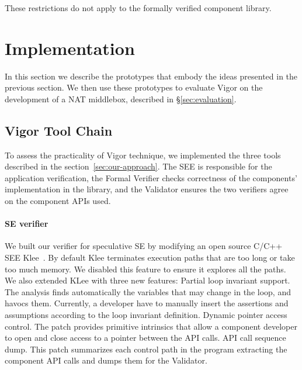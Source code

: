 \documentclass[letterpaper,twocolumn,10pt]{article}
\begin{document}
These restrictions do not apply to the formally verified component library. 



\section{Implementation}
\label{sec:implementation}

In this section we describe the prototypes that embody the ideas presented in the previous section. We then use these prototypes to evaluate Vigor on the development of a NAT middlebox, described in \S\ref{sec:evaluation}.

\subsection{Vigor Tool Chain}

To assess the practicality of Vigor technique, we implemented the three tools described in the section~\ref{sec:our-approach}. The SEE is responsible for the application verification, the Formal Verifier checks correctness of the components’ implementation in the library, and the Validator ensures the two verifiers agree on the component APIs used.

\paragraph{SE verifier} We built our verifier for speculative SE by modifying an open source C/C++ SEE Klee~\cite{cadar2008klee}. By default Klee terminates execution paths that are too long or take too much memory. We disabled this feature to ensure it explores all the paths. We also extended KLee with three new features:
Partial loop invariant support. The analysis finds automatically the variables that may change in the loop, and havocs them. Currently, a developer have to manually insert the assertions and assumptions according to the loop invariant definition.
Dynamic pointer access control. The patch provides primitive intrinsics that allow a component developer to open and close access to a pointer between the API calls.
API call sequence dump. This patch summarizes each control path in the program extracting the component API calls and dumps them for the Validator.
\end{document}
